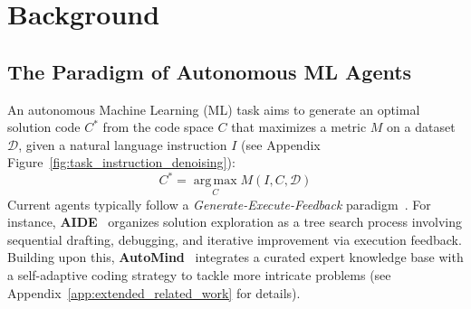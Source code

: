 






\section{Background}
\label{sec:background}

\subsection{The Paradigm of Autonomous ML Agents}
\label{sec:agent_paradigm}

An autonomous Machine Learning (ML) task aims to generate an optimal solution code $C^*$ from the code space $C$ that maximizes a metric $M$ on a dataset $\mathcal{D}$, given a natural language instruction $I$ (see Appendix Figure~\ref{fig:task_instruction_denoising}):
\begin{equation}
    C^* = \operatorname*{arg\,max}_{C} M(I, C, \mathcal{D})
\end{equation}
Current agents typically follow a \textit{Generate-Execute-Feedback} paradigm~\cite{zhu2025surveydataagentsemerging}.
For instance, \textbf{AIDE}~\cite{jiang2025aideaidrivenexplorationspace} organizes solution exploration as a tree search process involving sequential drafting, debugging, and iterative improvement via execution feedback.
Building upon this, \textbf{AutoMind}~\cite{ou2025automindadaptiveknowledgeableagent} integrates a curated expert knowledge base with a self-adaptive coding strategy to tackle more intricate problems (see Appendix~\ref{app:extended_related_work} for details).

